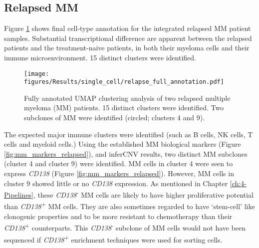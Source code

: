 \subsection{Relapsed MM}
Figure \ref{fig:full_anno_relapse} shows final cell-type annotation for the integrated relapsed MM patient samples.
Substantial transcriptional difference are apparent between the relapsed patients and the treatment-naive patients, in both their myeloma cells and their immune microenvironment.
15 distinct clusters were identified.
\begin{figure}[hpt]
\centering
\texttt{[image: figures/Results/single\_cell/relapse\_full\_annotation.pdf]}
\caption[Relapsed MM scRNA-seq full annotation]{Fully annotated UMAP clustering analysis of two relapsed multiple myeloma (MM) patients.
15 distinct clusters were identified.
Two subclones of MM were identified (circled; clusters 4 and 9).}
\label{fig:full_anno_relapse}
\end{figure}
The expected major immune clusters were identified (such as B cells, NK cells, T cells and myeloid cells.)
Using the established MM biological markers (Figure \ref{fig:mm_markers_relapsed}), and inferCNV results, two distinct MM subclones (cluster 4 and cluster 9) were identified.
MM cells in cluster 4 were seen to express \textit{CD138} (Figure \ref{fig:mm_markers_relapsed}).
However, MM cells in cluster 9 showed little or no \textit{CD138} expression.
As mentioned in Chapter \ref{ch:4-Pipelines}, these \textit{CD138}\textsuperscript{-} MM cells are likely to have higher proliferative potential than \textit{CD138}\textsuperscript{+} MM cells.
They are also sometimes regarded to have `stem-cell' like clonogenic properties and to be more resistant to chemotherapy than their \textit{CD138}\textsuperscript{+} counterparts\cite{setiadi2019cd138}.
This \textit{CD138}\textsuperscript{-} subclone of MM cells would not have been sequenced if \textit{CD138}\textsuperscript{+} enrichment techniques were used for sorting cells.

